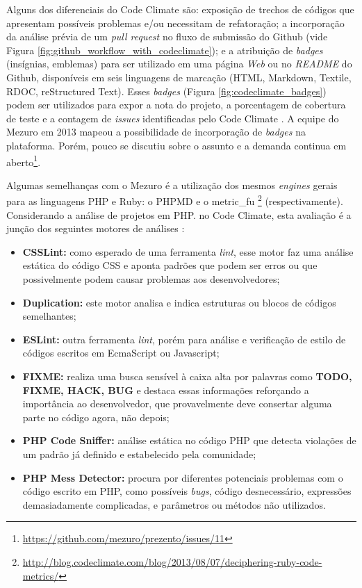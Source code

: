 \newpage

Alguns dos diferenciais do Code Climate são: exposição de trechos de códigos que
apresentam possíveis problemas e/ou necessitam de refatoração; a incorporação da
análise prévia de um \textit{pull request} no fluxo de submissão do Github (vide
Figura \ref{fig:github_workflow_with_codeclimate}); e a
atribuição de \textit{badges} (insígnias, emblemas) para ser utilizado em uma
página \textit{Web} ou no \textit{README} do Github, disponíveis em seis
linguagens de marcação (HTML, Markdown, Textile, RDOC, reStructured Text).
Esses \textit{badges} (Figura \ref{fig:codeclimate_badges}) podem ser utilizados
para expor a nota do projeto, a porcentagem de cobertura de teste e a contagem
de \textit{issues} identificadas pelo Code Climate \cite{codeClimateDoc}. A
equipe do Mezuro em 2013 mapeou a possibilidade de incorporação de \textit{badges}
na plataforma. Porém, pouco se discutiu sobre o assunto e a demanda continua em
aberto\footnote{\url{https://github.com/mezuro/prezento/issues/11}}.

Algumas semelhanças com o Mezuro é a utilização dos mesmos \textit{engines}
gerais para as linguagens PHP e Ruby: o PHPMD e o metric\_fu
\footnote{\url{http://blog.codeclimate.com/blog/2013/08/07/deciphering-ruby-code-metrics/}}
(respectivamente). Considerando a análise de projetos em PHP. no Code Climate,
esta avaliação é a junção dos seguintes motores de análises \cite{codeClimateDoc}:

\begin{itemize}
  \item \textbf{CSSLint:} como esperado de uma ferramenta \textit{lint}, esse
	motor faz uma análise estática do código CSS e aponta padrões que podem ser
	erros ou que possivelmente podem causar problemas aos desenvolvedores;
	\item \textbf{Duplication:} este motor analisa e indica estruturas ou blocos
	de códigos semelhantes;
	\item \textbf{ESLint:} outra ferramenta \textit{lint}, porém para análise e
	verificação de estilo de códigos escritos em EcmaScript ou Javascript;
	\item \textbf{FIXME:} realiza uma busca sensível à caixa alta por palavras
	como \textbf{TODO, FIXME, HACK, BUG} e destaca essas informações reforçando a
	importância ao desenvolvedor, que provavelmente deve consertar alguma parte no
	código agora, não depois;
	\item \textbf{PHP Code Sniffer:} análise estática no código PHP que detecta
	violações de um padrão já definido e estabelecido pela comunidade;
	\item \textbf{PHP Mess Detector:} procura por diferentes potenciais problemas
	com o código escrito em PHP, como possíveis \textit{bugs}, código desnecessário,
	expressões demasiadamente complicadas, e parâmetros ou métodos não utilizados.
\end{itemize}


